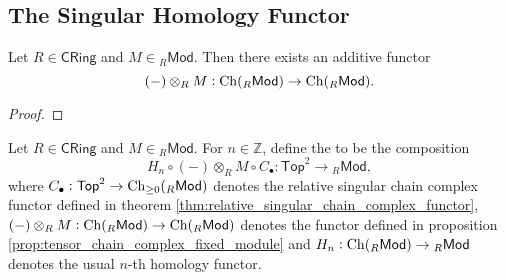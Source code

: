 \subsection*{The Singular Homology Functor}

\begin{proposition}
	\label{prop:tensor_chain_complex_fixed_module}
	Let $R \in \mathsf{CRing}$ and $M \in {_R}\mathsf{Mod}$. Then there exists an additive functor 
	\begin{equation*}
		(-)\otimes_R M : \operatorname{Ch}({_R}\mathsf{Mod}) \to \operatorname{Ch}({_R}\mathsf{Mod}).
	\end{equation*}
\end{proposition}

\begin{proof}
	
\end{proof}

\begin{definition}
	Let $R \in \mathsf{CRing}$ and $M \in {_R}\mathsf{Mod}$. For $n \in \mathbb{Z}$, define the  to be the composition
	\begin{equation}
		H_n \circ (-) \otimes_R M \circ C_\bullet : \mathsf{Top}^2 \to {_R}\mathsf{Mod},
	\end{equation}
	\noindent where $C_\bullet : \mathsf{Top}^2 \to \operatorname{Ch}_{\geq 0}({_R}\mathsf{Mod})$ denotes the relative singular chain complex functor defined in theorem \ref{thm:relative_singular_chain_complex_functor}, $(-) \otimes_R M : \operatorname{Ch}({_R}\mathsf{Mod}) \to \operatorname{Ch}({_R}\mathsf{Mod})$ denotes the functor defined in proposition \ref{prop:tensor_chain_complex_fixed_module} and $H_n : \operatorname{Ch}({_R}\mathsf{Mod}) \to {_R}\mathsf{Mod}$ denotes the usual $n$-th homology functor.
\end{definition}
